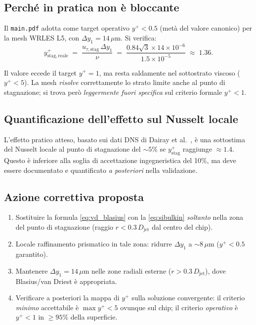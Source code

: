 \documentclass[11pt,a4paper]{article}
\newcommand{\Djet}{D_{\mathrm{jet}}}
\newcommand{\mum}{\,\mu\mathrm{m}}
\begin{document}
\subsection{Perché in pratica non è bloccante}

Il \texttt{main.pdf} adotta come target operativo $y^{+}<0.5$
(metà del valore canonico) per la mesh WRLES L5, con
$\Delta y_{1}=14\mum$. Si verifica:
\begin{equation}
  y^{+}_{\mathrm{stag,reale}}
   \;=\; \frac{u_{\tau,\mathrm{stag}}\,\Delta y_{1}}{\nu}
   \;=\; \frac{0.84\sqrt{3} \times 14\times 10^{-6}}{1.5\times 10^{-5}}
   \;\approx\; 1.36.
\end{equation}

Il valore eccede il target $y^{+}=1$, ma resta saldamente nel
sottostrato viscoso ($y^{+}<5$). La mesh \emph{risolve}
correttamente lo strato limite anche al punto di stagnazione; si
trova però \emph{leggermente fuori specifica} sul criterio formale
$y^{+}<1$.

\subsection{Quantificazione dell'effetto sul Nusselt locale}

L'effetto pratico atteso, basato sui dati DNS di Dairay et
al.~\cite{Dairay2015}, è una sottostima del Nusselt locale al punto
di stagnazione del $\sim 5\%$ se $y^{+}_{\mathrm{stag}}$ raggiunge
$\approx 1.4$. Questo è inferiore alla soglia di accettazione
ingegneristica del 10\%, ma deve essere documentato e quantificato
\emph{a posteriori} nella validazione.

\subsection{Azione correttiva proposta}

\begin{infobox}
\begin{enumerate}
  \item Sostituire la formula \eqref{eq:vd_blasius} con la
    \eqref{eq:sibulkin} \emph{soltanto} nella zona del punto di
    stagnazione (raggio $r < 0.3\,\Djet$ dal centro del chip).
  \item Locale raffinamento prismatico in tale zona: ridurre
    $\Delta y_{1}$ a $\sim 8\mum$ ($y^{+}<0.5$ garantito).
  \item Mantenere $\Delta y_{1}=14\mum$ nelle zone radiali
    esterne ($r>0.3\,\Djet$), dove Blasius/van Driest è
    appropriata.
  \item Verificare a posteriori la mappa di $y^{+}$ sulla soluzione
    convergente: il criterio \emph{minimo} accettabile è
    $\max y^{+} < 5$ ovunque sul chip; il criterio
    \emph{operativo} è $y^{+}<1$ in $\geq 95\%$ della superficie.
\end{enumerate}
\end{infobox}
\end{document}
